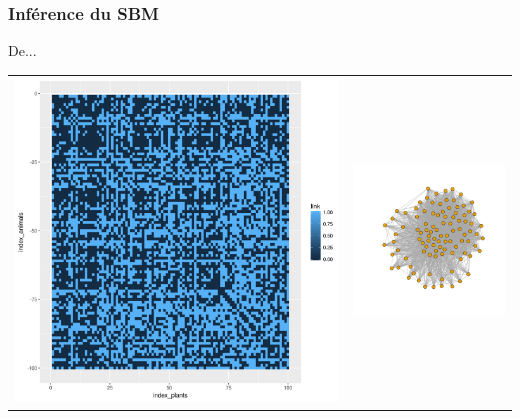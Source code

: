 \documentclass[nopagenumber,9pt]{beamer}
\begin{document}
 
 
\begin{frame}\frametitle{Inférence du SBM} 

De...

\centering
\begin{tabular}{cc}
 \includegraphics[scale=.2]{plots/sbm/Nested_adja.png}&
 \includegraphics[scale=.2]{plots/sbm/Nested_graphe_without_colors.png}
\end{tabular}
\end{frame}
\end{document}
